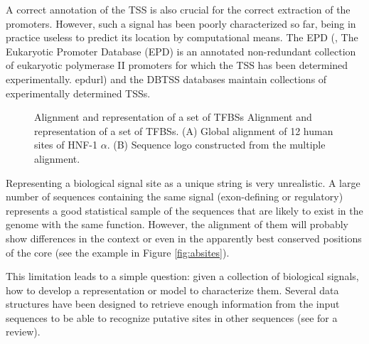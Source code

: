 A correct annotation of the TSS is also crucial for the correct extraction of the promoters. However, such a
signal has been poorly characterized so far, being in practice useless to predict its location by 
computational means. The EPD (\citealp{perier:2000a}, 
            {}
            {The Eukaryotic Promoter Database (EPD) is an annotated non-redundant collection of
             eukaryotic polymerase II promoters for which the TSS has been determined experimentally.}
            {epdurl})  and the DBTSS \citep{suzuki:2004a} databases maintain collections of 
experimentally determined TSSs. 

\begin{figure}[t!]
\begin{center}
\setlength{\fboxsep}{5pt}
          {Alignment and representation of a set of TFBSs}%
          {Alignment and representation of a set of TFBSs.}%
          {(A) Global alignment of 12 human sites of HNF-1 $\alpha$. (B) Sequence logo constructed from
the multiple alignment.}
\end{center}
\end{figure}


 
Representing a biological signal site as a unique string is very unrealistic. A large number of 
sequences containing the same signal (exon-defining or regulatory) represents a good statistical 
sample of the sequences that are likely to exist in the genome with the same function. 
However, the alignment of them will probably show differences in the context or even in the 
apparently best conserved positions of the core (see the example in Figure \ref{fig:absites}).

This limitation leads to a simple question: given a collection of biological signals, 
how to develop a representation or model to characterize them. Several data structures 
have been designed to retrieve enough information from the input sequences to be able
to recognize putative sites in other sequences (see \citet{osada:2004,stormo:2000b} for a review).

